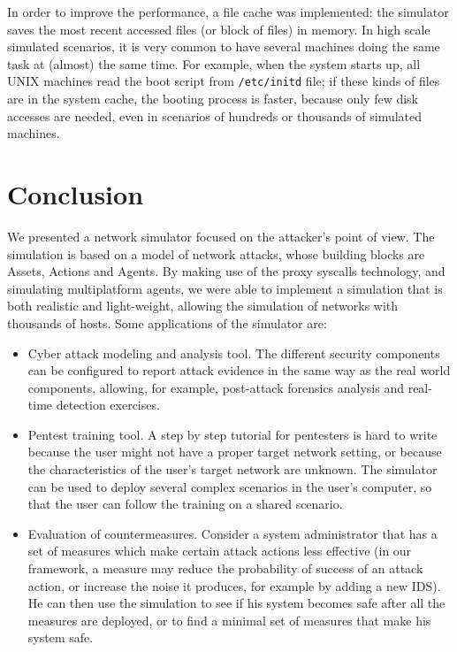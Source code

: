 \documentclass{llncs}
\begin{document}
In order to improve the performance, a file cache was implemented: the simulator saves the most recent accessed files
 (or block of files) in memory. In high scale simulated scenarios, it is very common to have several machines 
doing the same task at (almost) the same time. For example, when the system starts up, 
all UNIX machines read the boot script from {\tt /etc/initd} file; 
if these kinds of files are in the system cache,
 the booting process is faster, because only few disk accesses are needed, 
even in scenarios of hundreds or thousands of simulated machines.   


\section{Conclusion}

We presented a network simulator focused on the attacker's point of view.
The simulation is based on a model of network attacks, whose building blocks
are Assets, Actions and Agents.
By making use of the proxy syscalls technology, and simulating multiplatform agents,
we were able to implement a simulation that is both realistic and 
light-weight, allowing the simulation of networks with thousands of hosts.
Some applications of the simulator are:
\begin{itemize}
\item{Cyber attack modeling and analysis tool.
The different security components can be configured to report attack evidence
in the same way as the real world components, allowing, for example, post-attack
forensics analysis and real-time detection exercises.
}
\item{Pentest training tool.
A step by step tutorial for pentesters is hard to write because
the user might not have a proper target network setting,
or because the characteristics of the user's target network are unknown.
The simulator can be used to deploy several complex scenarios in the user's computer, 
so that the user can follow the training on a shared scenario.
}
\item{Evaluation of countermeasures.
Consider a system administrator that has a set of measures
which make certain attack actions less effective (in our framework, a measure
may reduce the probability of success of an attack action, or increase
the noise it produces, for example by adding a new IDS).
He can then use the simulation to see if his system becomes safe
after all the measures are deployed, or to find a minimal set
of measures that make his system safe.
}

\end{itemize}
\end{document}
